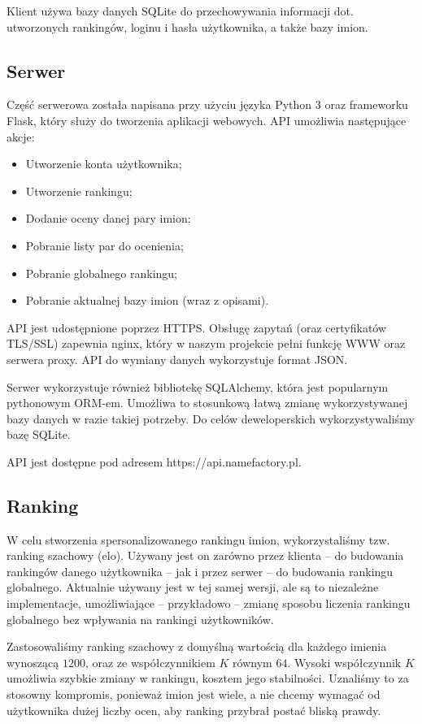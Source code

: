 \documentclass[12pt,a4paper]{article}
\begin{document}
Klient używa bazy danych SQLite do przechowywania informacji dot. utworzonych rankingów, loginu i hasła użytkownika, a także bazy imion.

\subsection{Serwer}
Część serwerowa została napisana przy użyciu języka Python 3 oraz frameworku Flask, który służy do tworzenia aplikacji webowych.
API umożliwia następujące akcje:

\begin{itemize}
    \item Utworzenie konta użytkownika;
    \item Utworzenie rankingu;
    \item Dodanie oceny danej pary imion;
    \item Pobranie listy par do ocenienia;
    \item Pobranie globalnego rankingu;
    \item Pobranie aktualnej bazy imion (wraz z opisami).
\end{itemize}

API jest udostępnione poprzez HTTPS.
Obsługę zapytań (oraz certyfikatów TLS/SSL) zapewnia nginx, który w naszym projekcie pełni funkcję WWW oraz serwera proxy.
API do wymiany danych wykorzystuje format JSON.

Serwer wykorzystuje również bibliotekę SQLAlchemy, która jest popularnym pythonowym ORM-em.
Umożliwa to stosunkową łatwą zmianę wykorzystywanej bazy danych w razie takiej potrzeby.
Do celów deweloperskich wykorzystywaliśmy bazę SQLite.

API jest dostępne pod adresem https://api.namefactory.pl.

\subsection{Ranking}
W celu stworzenia spersonalizowanego rankingu imion, wykorzystaliśmy tzw. ranking szachowy (elo).
Używany jest on zarówno przez klienta -- do budowania rankingów danego użytkownika -- jak i przez serwer -- do budowania rankingu globalnego.
Aktualnie używany jest w tej samej wersji, ale są to niezależne implementacje, umożliwiające -- przykładowo -- zmianę sposobu liczenia rankingu globalnego bez wpływania na rankingi użytkowników.

Zastosowaliśmy ranking szachowy z domyślną wartością dla każdego imienia wynoszącą \(1200\), oraz ze współczynnikiem \(K\) równym \(64\).
Wysoki współczynnik \(K\) umożliwia szybkie zmiany w rankingu, kosztem jego stabilności.
Uznaliśmy to za stosowny kompromis, ponieważ imion jest wiele, a nie chcemy wymagać od użytkownika dużej liczby ocen, aby ranking przybrał postać bliską prawdy.
\end{document}

